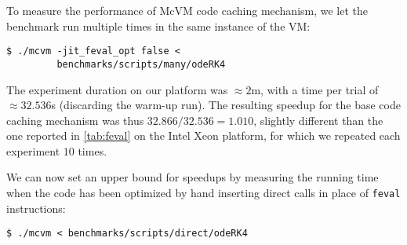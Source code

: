 \noindent To measure the performance of McVM code caching mechanism, we let the benchmark run multiple times in the same instance of the VM:

\begin{small}
\begin{verbatim}
$ ./mcvm -jit_feval_opt false <
         benchmarks/scripts/many/odeRK4
\end{verbatim}
\end{small}

\noindent The experiment duration on our platform was $\approx2$m, with a time per trial of $\approx32.536$s (discarding the warm-up run). The resulting speedup for the base code caching mechanism was thus $32.866/32.536=1.010$, slightly different than the one reported in \mytable\ref{tab:feval} on the Intel Xeon platform, for which we repeated each experiment $10$ times.

We can now set an upper bound for speedups by measuring the running time when the code has been optimized by hand inserting direct calls in place of {\tt feval} instructions:

\begin{small}
\begin{verbatim}
$ ./mcvm < benchmarks/scripts/direct/odeRK4
\end{verbatim}
\end{small}

